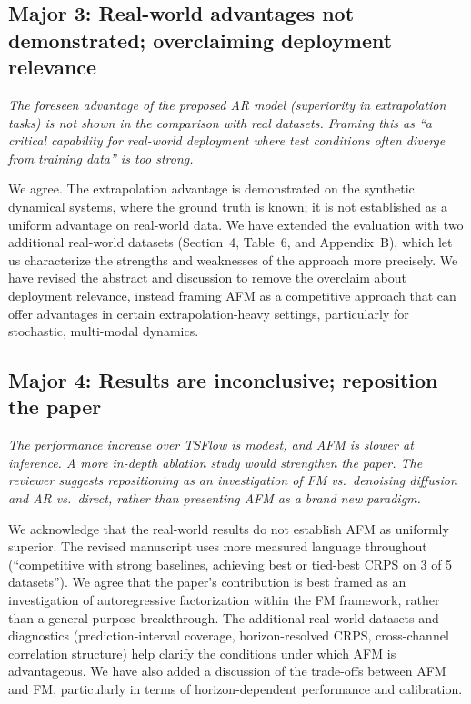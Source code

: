 \documentclass[11pt]{article}
\newcommand{\reviewertext}[1]{%
  \begin{reviewerquote}
    {\color{reviewercolor}\itshape #1}
  \end{reviewerquote}%
}
\newcommand{\authorresponse}[1]{%
    #1\par\medskip
}
\begin{document}
\subsection{Major 3: Real-world advantages not demonstrated; overclaiming deployment relevance}

\reviewertext{%
The foreseen advantage of the proposed AR model (superiority in extrapolation tasks) is not shown in the comparison with real datasets. Framing this as ``a critical capability for real-world deployment where test conditions often diverge from training data'' is too strong.
}

\authorresponse{%
We agree. The extrapolation advantage is demonstrated on the synthetic dynamical systems, where the ground truth is known; it is not established as a uniform advantage on real-world data. We have extended the evaluation with two additional real-world datasets (Section~4, Table~6, and Appendix~B), which let us characterize the strengths and weaknesses of the approach more precisely. We have revised the abstract and discussion to remove the overclaim about deployment relevance, instead framing AFM as a competitive approach that can offer advantages in certain extrapolation-heavy settings, particularly for stochastic, multi-modal dynamics.
}

\subsection{Major 4: Results are inconclusive; reposition the paper}

\reviewertext{%
The performance increase over TSFlow is modest, and AFM is slower at inference. A more in-depth ablation study would strengthen the paper. The reviewer suggests repositioning as an investigation of FM vs.\ denoising diffusion and AR vs.\ direct, rather than presenting AFM as a brand new paradigm.
}

\authorresponse{%
We acknowledge that the real-world results do not establish AFM as uniformly superior. The revised manuscript uses more measured language throughout (``competitive with strong baselines, achieving best or tied-best CRPS on 3 of 5 datasets''). We agree that the paper's contribution is best framed as an investigation of autoregressive factorization within the FM framework, rather than a general-purpose breakthrough.
The additional real-world datasets and diagnostics (prediction-interval coverage, horizon-resolved CRPS, cross-channel correlation structure) help clarify the conditions under which AFM is advantageous. We have also added a discussion of the trade-offs between AFM and FM, particularly in terms of horizon-dependent performance and calibration.
}
\end{document}
